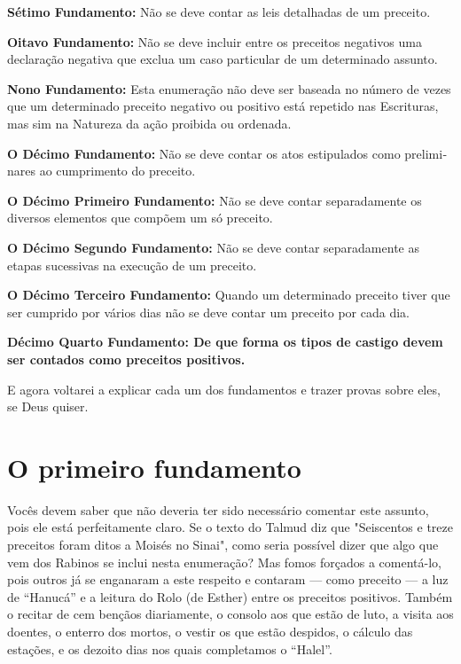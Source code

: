\textbf{Sétimo Fundamento:} Não se deve contar as leis detalhadas de
um preceito.

\textbf{Oitavo Fundamento:} Não se deve incluir entre os preceitos
negativos uma declaração negativa que exclua um caso particular de um
determinado assunto.
 
\textbf{Nono Fundamento:} Esta enumeração não deve ser baseada no
número de vezes que um determinado preceito negativo ou positivo está
repetido nas Es­crituras, mas sim na Natureza da ação proibida ou
ordenada.

\textbf{O Décimo Fundamento:} Não se deve contar os atos estipulados
como prelimi­nares ao cumprimento do preceito.

\textbf{O Décimo Primeiro Fundamento:} Não se deve contar separadamente
os diver­sos elementos que compõem um só preceito.

\textbf{O Décimo Segundo Fundamento:} Não se deve contar separadamente
as etapas sucessivas na execução de um preceito.

\textbf{O Décimo Terceiro Fundamento:} Quando um determinado preceito
tiver que ser cumprido por vários dias não se deve contar um preceito
por cada dia.

\textbf{Décimo Quarto Fundamento: De que forma os tipos de castigo
 devem ser contados como preceitos positivos.}

E agora voltarei a explicar cada um dos fundamentos e trazer provas
sobre eles, se Deus quiser.


\chapter*{O primeiro fundamento}

Vocês devem saber que não deveria ter sido necessário comentar este
assunto, pois ele está perfeitamente claro. Se o texto do Talmud diz que
"Seiscen­tos e treze preceitos foram ditos a Moisés no Sinai", como
seria possível dizer que algo que vem dos Rabinos se inclui nesta
enumeração? Mas fomos forçados a comentá-lo, pois outros já se enganaram
a este respeito e contaram --- como pre­ceito --- a luz de ``Hanucá'' e a
leitura do Rolo (de Esther) entre os preceitos positi­vos. Também o
recitar de cem bençãos diariamente, o consolo aos que estão de luto, a
visita aos doentes, o enterro dos mortos, o vestir os que estão
despidos, o cálculo das estações, e os dezoito dias nos quais
completamos o ``Halel''.

